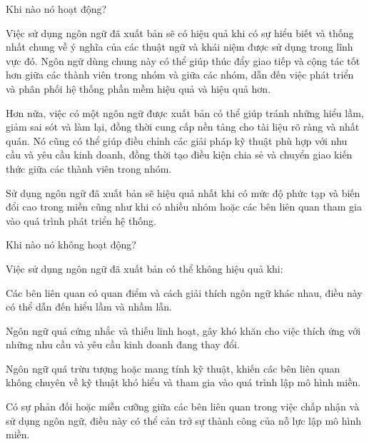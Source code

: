Khi nào nó hoạt động?

Việc sử dụng ngôn ngữ đã xuất bản sẽ có hiệu quả khi có sự hiểu biết và thống nhất chung về ý nghĩa của các thuật ngữ và khái niệm được sử dụng trong lĩnh vực đó. Ngôn ngữ dùng chung này có thể giúp thúc đẩy giao tiếp và cộng tác tốt hơn giữa các thành viên trong nhóm và giữa các nhóm, dẫn đến việc phát triển và phân phối hệ thống phần mềm hiệu quả và hiệu quả hơn.

Hơn nữa, việc có một ngôn ngữ được xuất bản có thể giúp tránh những hiểu lầm, giảm sai sót và làm lại, đồng thời cung cấp nền tảng cho tài liệu rõ ràng và nhất quán. Nó cũng có thể giúp điều chỉnh các giải pháp kỹ thuật phù hợp với nhu cầu và yêu cầu kinh doanh, đồng thời tạo điều kiện chia sẻ và chuyển giao kiến thức giữa các thành viên trong nhóm.

Sử dụng ngôn ngữ đã xuất bản sẽ hiệu quả nhất khi có mức độ phức tạp và biến đổi cao trong miền cũng như khi có nhiều nhóm hoặc các bên liên quan tham gia vào quá trình phát triển hệ thống.

Khi nào nó không hoạt động?

Việc sử dụng ngôn ngữ đã xuất bản có thể không hiệu quả khi:

Các bên liên quan có quan điểm và cách giải thích ngôn ngữ khác nhau, điều này có thể dẫn đến hiểu lầm và nhầm lẫn.

Ngôn ngữ quá cứng nhắc và thiếu linh hoạt, gây khó khăn cho việc thích ứng với những nhu cầu và yêu cầu kinh doanh đang thay đổi.

Ngôn ngữ quá trừu tượng hoặc mang tính kỹ thuật, khiến các bên liên quan không chuyên về kỹ thuật khó hiểu và tham gia vào quá trình lập mô hình miền.

Có sự phản đối hoặc miễn cưỡng giữa các bên liên quan trong việc chấp nhận và sử dụng ngôn ngữ, điều này có thể cản trở sự thành công của nỗ lực lập mô hình miền.







